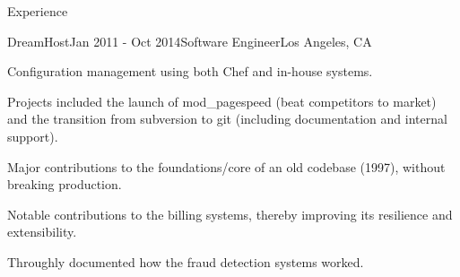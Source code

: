 \documentclass{resume} %
\begin{document}
\begin{rSection}{Experience}
\begin{rSubsection}{DreamHost}{Jan 2011 - Oct 2014}{Software Engineer}{Los Angeles, CA}
\item Configuration management using both Chef and in-house systems.
\item Projects included the launch of mod\_pagespeed (beat competitors to market) and the transition from subversion to git (including documentation and internal support).
\item Major contributions to the foundations/core of an old codebase (1997), without breaking production.
\item Notable contributions to the billing systems, thereby improving its resilience and extensibility.
\item Throughly documented how the fraud detection systems worked.

\end{rSubsection}
\end{rSection}
\end{document}
